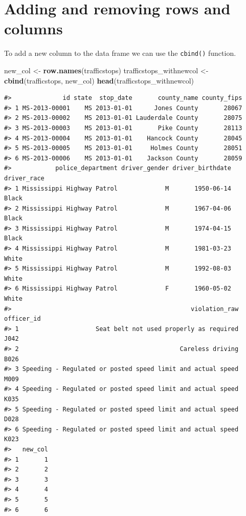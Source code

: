 \documentclass[]{book}
\newenvironment{Shaded}{\begin{snugshade}}{\end{snugshade}}
\newcommand{\KeywordTok}[1]{\textcolor[rgb]{0.13,0.29,0.53}{\textbf{{#1}}}}
\newcommand{\StringTok}[1]{\textcolor[rgb]{0.31,0.60,0.02}{{#1}}}
\newcommand{\NormalTok}[1]{{#1}}
\theoremstyle{definition}
\theoremstyle{definition}
\theoremstyle{remark}
\begin{document}
\section{Adding and removing rows and
columns}\label{adding-and-removing-rows-and-columns}

To add a new column to the data frame we can use the \texttt{cbind()}
function.

\begin{Shaded}
\begin{Highlighting}[]
\NormalTok{new_col <-}\StringTok{ }\KeywordTok{row.names}\NormalTok{(trafficstops)}
\NormalTok{trafficstops_withnewcol <-}\StringTok{ }\KeywordTok{cbind}\NormalTok{(trafficstops, new_col)}
\KeywordTok{head}\NormalTok{(trafficstops_withnewcol)}
\end{Highlighting}
\end{Shaded}

\begin{verbatim}
#>              id state  stop_date       county_name county_fips
#> 1 MS-2013-00001    MS 2013-01-01      Jones County       28067
#> 2 MS-2013-00002    MS 2013-01-01 Lauderdale County       28075
#> 3 MS-2013-00003    MS 2013-01-01       Pike County       28113
#> 4 MS-2013-00004    MS 2013-01-01    Hancock County       28045
#> 5 MS-2013-00005    MS 2013-01-01     Holmes County       28051
#> 6 MS-2013-00006    MS 2013-01-01    Jackson County       28059
#>            police_department driver_gender driver_birthdate driver_race
#> 1 Mississippi Highway Patrol             M       1950-06-14       Black
#> 2 Mississippi Highway Patrol             M       1967-04-06       Black
#> 3 Mississippi Highway Patrol             M       1974-04-15       Black
#> 4 Mississippi Highway Patrol             M       1981-03-23       White
#> 5 Mississippi Highway Patrol             M       1992-08-03       White
#> 6 Mississippi Highway Patrol             F       1960-05-02       White
#>                                                 violation_raw officer_id
#> 1                     Seat belt not used properly as required       J042
#> 2                                            Careless driving       B026
#> 3 Speeding - Regulated or posted speed limit and actual speed       M009
#> 4 Speeding - Regulated or posted speed limit and actual speed       K035
#> 5 Speeding - Regulated or posted speed limit and actual speed       D028
#> 6 Speeding - Regulated or posted speed limit and actual speed       K023
#>   new_col
#> 1       1
#> 2       2
#> 3       3
#> 4       4
#> 5       5
#> 6       6
\end{verbatim}
\end{document}

